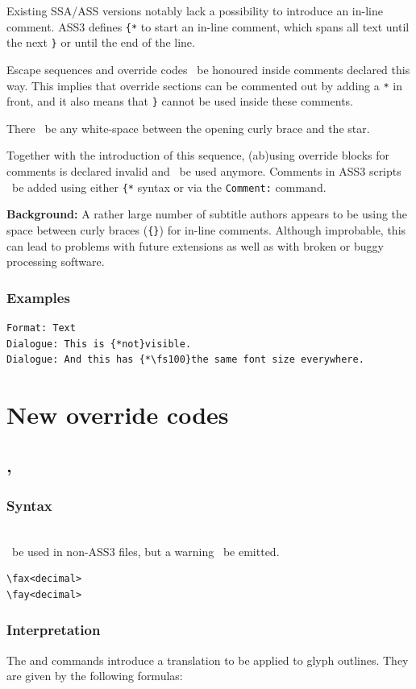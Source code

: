 \documentclass{spec}
\newcommand{\syntax}[1]{
	\subsubsection*{Syntax}
	\begin{tabbing}
	\hspace{2cm}\=\\[-16pt]
	#1
	\end{tabbing}
}
\gdef\compat{}
\newcommand{\mayuse}[1]{\may\ be used in non-ASS3 files, but a warning \should\ be emitted.%
\gappto{\compat}{\hspace{9pt} #1 & optional\\[3pt]}}
\begin{document}
Existing SSA/ASS versions notably lack a possibility to introduce an
in-line comment. ASS3 defines \texttt{\{*} to start an in-line comment,
which spans all text until the next \texttt{\}} or until the end of the line.

Escape sequences and override codes \mustnot\ be honoured inside comments
declared this way. This implies that override sections can be commented out by
adding a \texttt{*} in front, and it also means that \texttt{\}} cannot
be used inside these comments.

There \mustnot\ be any white-space between the opening curly brace and the
star.

Together with the introduction of this sequence, (ab)using override blocks
for comments is declared invalid and \mustnot\ be used anymore. Comments in
ASS3 scripts \must\ be added using either \texttt{\{*} syntax or via the
\texttt{Comment:} command.

{\footnotesize
\textbf{Background:} A rather large number of subtitle authors appears to be
using the space between curly braces (\texttt{\{\}}) for in-line comments.
Although improbable, this can lead to problems with future extensions
as well as with broken or buggy processing software.
}

\subsubsection*{Examples}
\begin{verbatim}
Format: Text
Dialogue: This is {*not}visible.
Dialogue: And this has {*\fs100}the same font size everywhere.
\end{verbatim}

\section{New override codes}
\subsection{, }
\syntax{\mayuse{\oc{fax}, \oc{fay}}}
\begin{verbatim}
\fax<decimal>
\fay<decimal>
\end{verbatim}

\subsubsection*{Interpretation}
The  and  commands introduce a translation to be applied to
glyph outlines. They are given by the following formulas:
\end{document}
